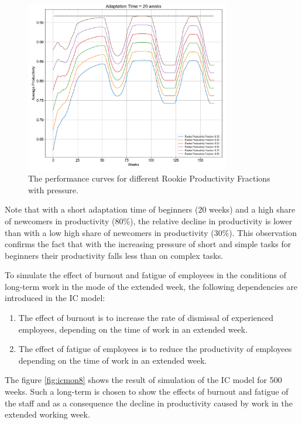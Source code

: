 \documentclass[12pt]{report}
\theoremstyle{definition}
\providecommand{\tightlist}{%
	\setlength{\itemsep}{0pt}\setlength{\parskip}{0pt}}
\begin{document}
\begin{figure}[H]
	\centering
	\includegraphics[width=0.8\textwidth]{icmon7}
	\caption{The performance curves for different Rookie Productivity Fractions with pressure.}
	\label{fig:icmon7}
\end{figure} 

Note that with a short adaptation time of beginners (20 weeks) and a high share of newcomers in productivity (80\%), the relative decline in productivity is lower than with a low high share of newcomers in productivity (30\%). 
This observation confirms the fact that with the increasing pressure of short and simple tasks for beginners their productivity falls less than on complex tasks.

To simulate the effect of burnout and fatigue of employees in the conditions of long-term work in the mode of the extended week, the following dependencies are introduced in the IC model:

\begin{enumerate}
	\tightlist
	\item The effect of burnout is to increase the rate of dismissal of experienced employees, depending on the time of work in an extended week.
	\item The effect of fatigue of employees is to reduce the productivity of employees depending on the time of work in an extended week.
\end{enumerate}

The figure \ref{fig:icmon8} shows the result of simulation of the IC model for 500 weeks. 
Such a long-term is chosen to show the effects of burnout and fatigue of the staff and as a consequence the decline in productivity caused by work in the extended working week.
\end{document}
